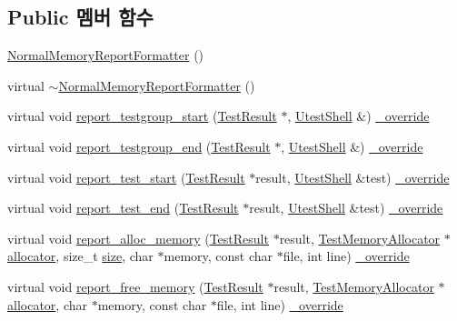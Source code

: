 \subsection*{Public 멤버 함수}
\begin{DoxyCompactItemize}
\item 
\hyperlink{class_normal_memory_report_formatter_abc663e7784a3dbfd2e6e7abc2a90bb3b}{Normal\+Memory\+Report\+Formatter} ()
\item 
virtual \hyperlink{class_normal_memory_report_formatter_aa487cb3f8e1d27049abb7eb58ab76a0a}{$\sim$\+Normal\+Memory\+Report\+Formatter} ()
\item 
virtual void \hyperlink{class_normal_memory_report_formatter_a99aaf8f329095fe9494d07c965b7e7bf}{report\+\_\+testgroup\+\_\+start} (\hyperlink{class_test_result}{Test\+Result} $\ast$, \hyperlink{class_utest_shell}{Utest\+Shell} \&) \hyperlink{_cpp_u_test_config_8h_a049bea15dd750e15869863c94c1efc3b}{\+\_\+override}
\item 
virtual void \hyperlink{class_normal_memory_report_formatter_a654fe66c6d74e1276278ad0fbf6af3aa}{report\+\_\+testgroup\+\_\+end} (\hyperlink{class_test_result}{Test\+Result} $\ast$, \hyperlink{class_utest_shell}{Utest\+Shell} \&) \hyperlink{_cpp_u_test_config_8h_a049bea15dd750e15869863c94c1efc3b}{\+\_\+override}
\item 
virtual void \hyperlink{class_normal_memory_report_formatter_ab6b7ea5f2e0c5bdad43b71b76881f362}{report\+\_\+test\+\_\+start} (\hyperlink{class_test_result}{Test\+Result} $\ast$result, \hyperlink{class_utest_shell}{Utest\+Shell} \&test) \hyperlink{_cpp_u_test_config_8h_a049bea15dd750e15869863c94c1efc3b}{\+\_\+override}
\item 
virtual void \hyperlink{class_normal_memory_report_formatter_a2b191434b124b93d8c0ed5a05e084e02}{report\+\_\+test\+\_\+end} (\hyperlink{class_test_result}{Test\+Result} $\ast$result, \hyperlink{class_utest_shell}{Utest\+Shell} \&test) \hyperlink{_cpp_u_test_config_8h_a049bea15dd750e15869863c94c1efc3b}{\+\_\+override}
\item 
virtual void \hyperlink{class_normal_memory_report_formatter_a662fcaf995e9e0137c8debfc33530366}{report\+\_\+alloc\+\_\+memory} (\hyperlink{class_test_result}{Test\+Result} $\ast$result, \hyperlink{class_test_memory_allocator}{Test\+Memory\+Allocator} $\ast$\hyperlink{_memory_leak_warning_test_8cpp_a83fc2e9b9142613f7df2bcc3ff8292bc}{allocator}, size\+\_\+t \hyperlink{gst__avb__playbin_8c_a439227feff9d7f55384e8780cfc2eb82}{size}, char $\ast$memory, const char $\ast$file, int line) \hyperlink{_cpp_u_test_config_8h_a049bea15dd750e15869863c94c1efc3b}{\+\_\+override}
\item 
virtual void \hyperlink{class_normal_memory_report_formatter_ae5e392cdf5fece2cbd2eeb25e8478c8f}{report\+\_\+free\+\_\+memory} (\hyperlink{class_test_result}{Test\+Result} $\ast$result, \hyperlink{class_test_memory_allocator}{Test\+Memory\+Allocator} $\ast$\hyperlink{_memory_leak_warning_test_8cpp_a83fc2e9b9142613f7df2bcc3ff8292bc}{allocator}, char $\ast$memory, const char $\ast$file, int line) \hyperlink{_cpp_u_test_config_8h_a049bea15dd750e15869863c94c1efc3b}{\+\_\+override}
\end{DoxyCompactItemize}


